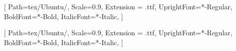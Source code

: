\usepackage{geometry}
\usepackage{fancyhdr}

\setlength{\footskip}{20pt}

 
\setsansfont{Ubuntu}[
    Path=tex/Ubuntu/,
    Scale=0.9,
    Extension = .ttf,
    UprightFont=*-Regular,
    BoldFont=*-Bold,
    ItalicFont=*-Italic,
    ]

\setmainfont{Ubuntu}[
    Path=tex/Ubuntu/,
    Scale=0.9,
    Extension = .ttf,
    UprightFont=*-Regular,
    BoldFont=*-Bold,
    ItalicFont=*-Italic,
    ]

\titlehead{\texttt{[image: img/irtlib-cover.png]}}
